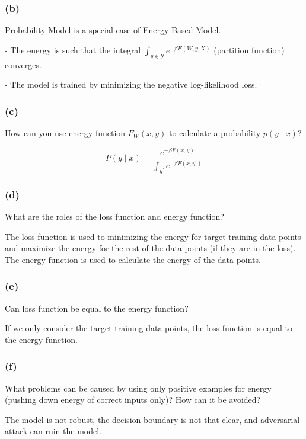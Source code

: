 \subsubsection*{(b)}
Probability Model is a special case of Energy Based Model.

- The energy is such that the integral $\int_{y \in \mathcal{Y}} e^{-\beta E(W, y, X)}$ (partition function) converges.

- The model is trained by minimizing the negative log-likelihood loss.

\subsubsection*{(c)}
How can you use energy function $F_W(x, y)$ to calculate a probability $p(y \mid x)$?

\begin{equation}
    P(y \mid x)=\frac{e^{-\beta F(x, y)}}{\int_{y^{\prime}} e^{-\beta F\left(x, y^{\prime}\right)}}
\end{equation}

\subsubsection*{(d)}
What are the roles of the loss function and energy function? 

The loss function is used to minimizing the energy for target training data points and maximize the energy for the rest of the data points (if they are in the loss).
The energy function is used to calculate the energy of the data points.


\subsubsection*{(e)}
Can loss function be equal to the energy function?

If we only consider the target training data points, the loss function is equal to the energy function.

\subsubsection*{(f)}
What problems can be caused by using only positive examples for energy (pushing down energy of correct inputs only)? How can it be avoided?

The model is not robust, the decision boundary is not that clear, and adversarial attack can ruin the model.

